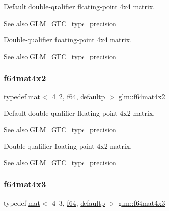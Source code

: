 Default double-\/qualifier floating-\/point 4x4 matrix. \begin{DoxySeeAlso}{See also}
\mbox{\hyperlink{group__gtc__type__precision}{G\+L\+M\+\_\+\+G\+T\+C\+\_\+type\+\_\+precision}}
\end{DoxySeeAlso}
Double-\/qualifier floating-\/point 4x4 matrix. \begin{DoxySeeAlso}{See also}
\mbox{\hyperlink{group__gtc__type__precision}{G\+L\+M\+\_\+\+G\+T\+C\+\_\+type\+\_\+precision}} 
\end{DoxySeeAlso}
\mbox{\label{group__gtc__type__precision_ga704001c2ed5838498ff61f55995fed3a}} 
\subsubsection{\texorpdfstring{f64mat4x2}{f64mat4x2}}
{\footnotesize\ttfamily typedef \mbox{\hyperlink{structglm_1_1mat}{mat}}$<$ 4, 2, \mbox{\hyperlink{group__gtc__type__precision_ga2bba392e555124b36cde6abba349bab3}{f64}}, \mbox{\hyperlink{namespaceglm_a36ed105b07c7746804d7fdc7cc90ff25a9d21ccd8b5a009ec7eb7677befc3bf51}{defaultp}} $>$ \mbox{\hyperlink{group__gtc__type__precision_ga704001c2ed5838498ff61f55995fed3a}{glm\+::f64mat4x2}}}

Default double-\/qualifier floating-\/point 4x2 matrix. \begin{DoxySeeAlso}{See also}
\mbox{\hyperlink{group__gtc__type__precision}{G\+L\+M\+\_\+\+G\+T\+C\+\_\+type\+\_\+precision}}
\end{DoxySeeAlso}
Double-\/qualifier floating-\/point 4x2 matrix. \begin{DoxySeeAlso}{See also}
\mbox{\hyperlink{group__gtc__type__precision}{G\+L\+M\+\_\+\+G\+T\+C\+\_\+type\+\_\+precision}} 
\end{DoxySeeAlso}
\mbox{\label{group__gtc__type__precision_gaf9b2bfbb2c79a39c693e2ab2bedf30e5}} 
\subsubsection{\texorpdfstring{f64mat4x3}{f64mat4x3}}
{\footnotesize\ttfamily typedef \mbox{\hyperlink{structglm_1_1mat}{mat}}$<$ 4, 3, \mbox{\hyperlink{group__gtc__type__precision_ga2bba392e555124b36cde6abba349bab3}{f64}}, \mbox{\hyperlink{namespaceglm_a36ed105b07c7746804d7fdc7cc90ff25a9d21ccd8b5a009ec7eb7677befc3bf51}{defaultp}} $>$ \mbox{\hyperlink{group__gtc__type__precision_gaf9b2bfbb2c79a39c693e2ab2bedf30e5}{glm\+::f64mat4x3}}}


